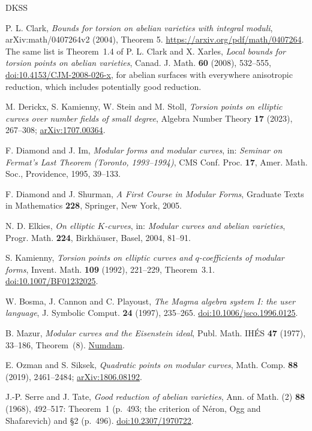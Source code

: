 \documentclass[11pt]{article}
\begin{document}
\begin{thebibliography}{DKSS}

P. L. Clark, \emph{Bounds for torsion on abelian varieties with integral moduli},
arXiv:math/0407264v2 (2004), Theorem 5. \url{https://arxiv.org/pdf/math/0407264}.
The same list is Theorem~1.4 of P. L. Clark and X. Xarles, \emph{Local bounds for torsion points
on abelian varieties}, Canad. J. Math. \textbf{60} (2008), 532--555,
\href{https://doi.org/10.4153/CJM-2008-026-x}{doi:10.4153/CJM-2008-026-x}, for abelian surfaces
with everywhere anisotropic reduction, which includes potentially good reduction.

M. Derickx, S. Kamienny, W. Stein and M. Stoll, \emph{Torsion points on elliptic curves over
number fields of small degree}, Algebra Number Theory \textbf{17} (2023), 267--308;
\href{https://arxiv.org/abs/1707.00364}{arXiv:1707.00364}.

F. Diamond and J. Im, \emph{Modular forms and modular curves}, in: \emph{Seminar on Fermat's
Last Theorem (Toronto, 1993--1994)}, CMS Conf. Proc. \textbf{17}, Amer. Math. Soc., Providence,
1995, 39--133.

F. Diamond and J. Shurman, \emph{A First Course in Modular Forms}, Graduate Texts in Mathematics
\textbf{228}, Springer, New York, 2005.

N. D. Elkies, \emph{On elliptic \(K\)-curves}, in: \emph{Modular curves and abelian varieties},
Progr. Math. \textbf{224}, Birkh\"auser, Basel, 2004, 81--91.

S. Kamienny, \emph{Torsion points on elliptic curves and \(q\)-coefficients of modular forms},
Invent. Math. \textbf{109} (1992), 221--229, Theorem~3.1.
\href{https://doi.org/10.1007/BF01232025}{doi:10.1007/BF01232025}.

W. Bosma, J. Cannon and C. Playoust, \emph{The Magma algebra system I: the user language},
J. Symbolic Comput. \textbf{24} (1997), 235--265.
\href{https://doi.org/10.1006/jsco.1996.0125}{doi:10.1006/jsco.1996.0125}.

B. Mazur, \emph{Modular curves and the Eisenstein ideal}, Publ. Math. IH\'ES \textbf{47} (1977),
33--186, Theorem~(8). \href{https://www.numdam.org/item/PMIHES_1977__47__33_0/}{Numdam}.

E. Ozman and S. Siksek, \emph{Quadratic points on modular curves}, Math. Comp. \textbf{88}
(2019), 2461--2484; \href{https://arxiv.org/abs/1806.08192}{arXiv:1806.08192}.

J.-P. Serre and J. Tate, \emph{Good reduction of abelian varieties}, Ann. of Math. (2)
\textbf{88} (1968), 492--517: Theorem~1 (p.~493; the criterion of N\'eron, Ogg and Shafarevich)
and \S2 (p.~496).
\href{https://doi.org/10.2307/1970722}{doi:10.2307/1970722}.

\end{thebibliography}
\end{document}

